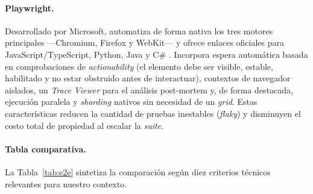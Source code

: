 \documentclass[12pt]{article}
\begin{document}
\paragraph{Playwright.}
Desarrollado por Microsoft, automatiza de forma nativa los tres motores principales
---Chromium, Firefox y WebKit--- y ofrece enlaces oficiales para JavaScript/TypeScript,
Python, Java y C\# \citep{playwrightdocs}. Incorpora espera automática basada en
comprobaciones de \textit{actionability} (el elemento debe ser visible, estable, habilitado
y no estar obstruido antes de interactuar), contextos de navegador aislados, un
\textit{Trace Viewer} para el análisis post-mortem y, de forma destacada, ejecución
paralela y \textit{sharding} nativos sin necesidad de un \textit{grid}. Estas
características reducen la cantidad de pruebas inestables (\textit{flaky}) y disminuyen el
costo total de propiedad al escalar la \textit{suite}.

\paragraph{Tabla comparativa.}
La Tabla~\ref{tab:e2e} sintetiza la comparación según diez criterios técnicos relevantes
para nuestro contexto.
\end{document}
